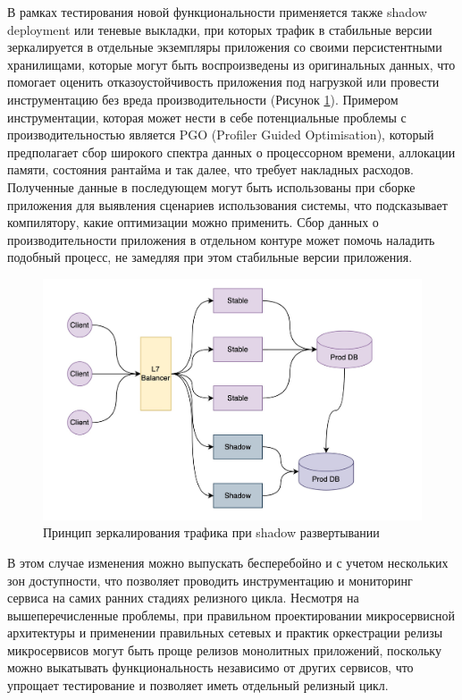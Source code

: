 В рамках тестирования новой функциональности применяется также shadow deployment или теневые выкладки,
при которых трафик в стабильные версии зеркалируется в отдельные экземпляры приложения со своими персистентными хранилищами,
которые могут быть воспроизведены из оригинальных данных, что помогает оценить отказоустойчивость
приложения под нагрузкой или провести инструментацию без вреда производительности (Рисунок \ref{fig:shadow}).
Примером инструментации, которая может нести в себе потенциальные проблемы с производительностью
является PGO (Profiler Guided Optimisation), который предполагает сбор широкого спектра данных о
процессорном времени, аллокации памяти, состояния рантайма и так далее, что требует накладных расходов.
Полученные данные в последующем могут быть использованы при сборке приложения для выявления сценариев
использования системы, что подсказывает компилятору, какие оптимизации можно применить.
Сбор данных о производительности приложения в отдельном контуре может помочь наладить подобный процесс, не замедляя
при этом стабильные версии приложения.
\begin{figure}[H]
    \centering
    \includegraphics[width=0.8\linewidth]{img/shadow.jpg}
    \caption{Принцип зеркалирования трафика при shadow развертывании}
    \label{fig:shadow}
\end{figure}

В этом случае изменения можно выпускать бесперебойно и с учетом нескольких зон
доступности, что позволяет проводить инструментацию и мониторинг сервиса на самих ранних стадиях релизного цикла.
Несмотря на вышеперечисленные проблемы, при правильном проектировании микросервисной архитектуры и применении правильных сетевых и практик оркестрации 
релизы микросервисов могут быть проще релизов монолитных приложений, поскольку можно выкатывать функциональность независимо от других 
сервисов, что упрощает тестирование и позволяет иметь отдельный релизный цикл.

